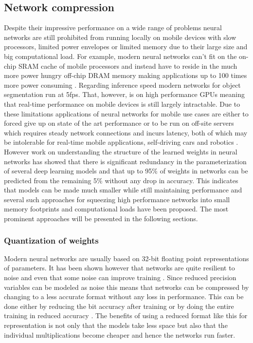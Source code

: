 \documentclass{kththesis}
\newcommand{\bibentry}[1]{\parencite{#1}}
\begin{document}
  \subsection{Network compression}
Despite their impressive performance on a wide range of problems neural networks
are still prohibited from running locally on mobile devices with slow
processors, limited power envelopes or limited memory due to their large size
and big computational load. For example, modern neural networks can't fit on the
on-chip SRAM cache of mobile processors and instead have to reside in the much more power hungry
off-chip DRAM memory making applications up to 100 times more power consuming
\bibentry{han2015learning}. Regarding inference speed modern networks
for object segmentation \bibentry{he2017mask} run at 5fps. That, however, is on high
performance GPUs meaning that real-time performance on mobile devices is still
largely intractable. Due to
these limitations applications of neural networks for mobile use cases are
either to forced give up on state of the art performance or to be run on
off-site servers which requires steady network connections and incurs latency,
both of which may be intolerable for real-time mobile applications, self-driving
cars and robotics \bibentry{jin2014flattened}. However work on understanding the
structure of the learned weights in neural networks
\bibentry{denil2013predicting} has showed that there is significant redundancy
in the parameterization of several deep learning models and that up to 95\% of
weights in networks can be predicted from the remaining 5\% without any drop in
accuracy. This indicates that models can be made much smaller while still
maintaining performance and several such approaches for squeezing high
performance networks into small memory footprints and computational loads have
been proposed. The most prominent approaches will be presented in the following
sections.  

\subsubsection{Quantization of weights}
Modern neural networks are usually based on 32-bit floating point
representations of parameters. It has been shown however that networks are quite
resilient to noise and even that some noise can improve training
\bibentry{murray1994enhanced}. Since reduced precision variables can be modeled
as noise this means that networks can be compressed by changing to a less
accurate format without any loss in performance. This can be done either by
reducing the bit accuracy after training \bibentry{vanhoucke2011improving}  or
by doing the entire training in reduced accuracy \bibentry{hubara2016quantized}
\bibentry{gupta2015deep}. The benefits of using a reduced format like this for
representation is not only that the models take less space but also that the
individual multiplications become cheaper and hence the networks run faster. 
\end{document}
